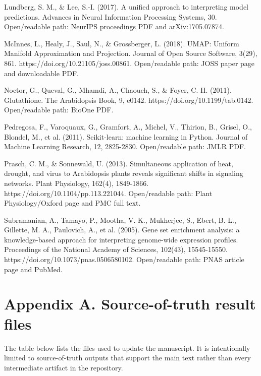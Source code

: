\documentclass[11pt]{article}
\begin{document}
Lundberg, S. M., \& Lee, S.-I. (2017). A unified approach to interpreting model predictions. Advances in Neural Information Processing Systems, 30. Open/readable path: NeurIPS proceedings PDF and arXiv:1705.07874.

McInnes, L., Healy, J., Saul, N., \& Grossberger, L. (2018). UMAP: Uniform Manifold Approximation and Projection. Journal of Open Source Software, 3(29), 861. https://doi.org/10.21105/joss.00861. Open/readable path: JOSS paper page and downloadable PDF.

Noctor, G., Queval, G., Mhamdi, A., Chaouch, S., \& Foyer, C. H. (2011). Glutathione. The Arabidopsis Book, 9, e0142. https://doi.org/10.1199/tab.0142. Open/readable path: BioOne PDF.

Pedregosa, F., Varoquaux, G., Gramfort, A., Michel, V., Thirion, B., Grisel, O., Blondel, M., et al. (2011). Scikit-learn: machine learning in Python. Journal of Machine Learning Research, 12, 2825-2830. Open/readable path: JMLR PDF.

Prasch, C. M., \& Sonnewald, U. (2013). Simultaneous application of heat, drought, and virus to Arabidopsis plants reveals significant shifts in signaling networks. Plant Physiology, 162(4), 1849-1866. https://doi.org/10.1104/pp.113.221044. Open/readable path: Plant Physiology/Oxford page and PMC full text.

Subramanian, A., Tamayo, P., Mootha, V. K., Mukherjee, S., Ebert, B. L., Gillette, M. A., Paulovich, A., et al. (2005). Gene set enrichment analysis: a knowledge-based approach for interpreting genome-wide expression profiles. Proceedings of the National Academy of Sciences, 102(43), 15545-15550. https://doi.org/10.1073/pnas.0506580102. Open/readable path: PNAS article page and PubMed.

\appendix
\section{Appendix A. Source-of-truth result files}
The table below lists the files used to update the manuscript. It is intentionally limited to source-of-truth outputs that support the main text rather than every intermediate artifact in the repository.
\end{document}
